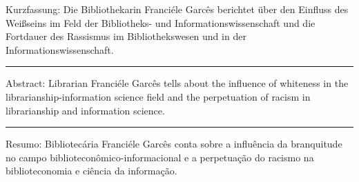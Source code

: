 Kurzfassung: Die Bibliothekarin Franciéle Garcês berichtet über den
Einfluss des Weißseins im Feld der Bibliotheks- und
Informationswissenschaft und die Fortdauer des Rassismus im
Bibliothekswesen und in der Informationswissenschaft.

\begin{center}\rule{0.5\linewidth}{0.5pt}\end{center}

Abstract: Librarian Franciéle Garcês tells about the influence of
whiteness in the librarianship-information science field and the
perpetuation of racism in librarianship and information science.

\begin{center}\rule{0.5\linewidth}{0.5pt}\end{center}

Resumo: Bibliotecária Franciéle Garcês conta sobre a influência da
branquitude no campo biblioteconômico-informacional e a perpetuação do
racismo na biblioteconomia e ciência da informação.
